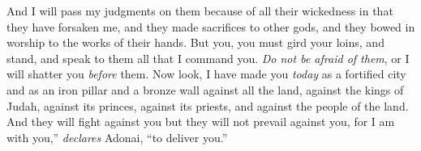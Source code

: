 \begin{biblechapter}
\verse And I will pass my judgments on them because of all their wickedness in that they have forsaken me, and they made sacrifices to other gods, and they bowed in worship to the works of their hands.
\verse But you, you must gird your loins, and stand, and speak to them all that I command you. \textit{Do not be afraid of them}, or I will shatter you \textit{before} them.
\verse Now look, I have made you \textit{today} as a fortified city and as an iron pillar and a bronze wall against all the land, against the kings of Judah, against its princes, against its priests, and against the people of the land.
\verse And they will fight against you but they will not prevail against you, for I am with you,” \textit{declares} Adonai, “to deliver you.”
\end{biblechapter}

